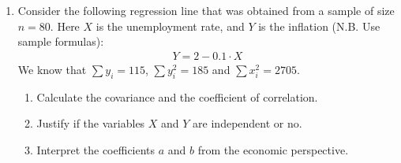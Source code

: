 \documentclass[12pt]{article}
\begin{document}
\begin{enumerate}
{\begin{enumerate}
\item Find the slope of the regression \( Y = a + b \cdot X \) and interpret it:

\begin{itemize}
    \item The slope \( b \) is calculated as:
    \[
    b = \frac{\sigma_{xy}}{\sigma_x^2} = \frac{-0.02}{6.16} = -0.0032.
    \]
    \item Interpretation: For each additional degree of Celsius in temperature, the electricity consumption \( Y \) is expected to decrease by approximately \( 0.0032 \) kWh. However, since the slope is very small, this change is negligible.
\end{itemize}

\item What is the predicted daily electricity consumption in kWh if the temperature is \( x^* = 19 \) degrees of Celsius?

\begin{itemize}
    \item The predicted electricity consumption is calculated using the regression equation:
    \[
    \hat{Y} = a + b \cdot x^*.
    \]
    \item First, calculate the intercept \( a \):
    \[
    a = \bar{y} - b \cdot \bar{x} = 5.6 - (-0.0032 \times 20.2) \approx 5.6.
    \]
    \item Now, substitute \( x^* = 19 \) into the regression equation:
    \[
    \hat{Y} = 5.6 + (-0.0032) \times 19 \approx 5.6 \text{ kWh}.
    \]
    \item Interpretation: If the temperature is \( 19 \) degrees Celsius, the model predicts an electricity consumption of approximately \( 5.6 \) kWh.
\end{itemize}

\end{enumerate}


}

\item   Consider the following regression line that was obtained from a sample of size $n=80$. Here $X$ is the unemployment rate, and $Y$ is the inflation (N.B. Use sample formulas):
\begin{align*}
Y = 2-0.1\cdot X
\end{align*}
We know that $\sum y_i=115$, $\sum y_i^2=185$ and $\sum x_i^2=2705$.


\begin{enumerate}
\item  Calculate the covariance and the coefficient of correlation.
\item  Justify if the variables $X$ and $Y$ are independent or no.
\item  Interpret the coefficients $a$ and $b$ from the economic perspective.
\end{enumerate}


\end{enumerate}
\end{document}

